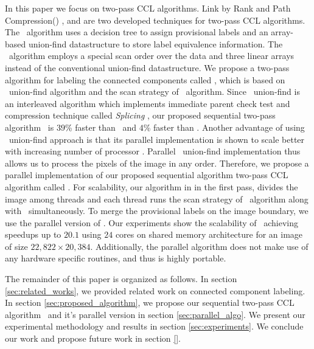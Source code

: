 In this paper we focus on two-pass CCL algorithms. Link by Rank and Path
Compression(\lrpc) \cite{Wu2009_LRPC}, and \arun \cite{He2012_ARun} are two
developed techniques for two-pass CCL algorithms.
The \lrpc\ algorithm uses a decision tree to assign provisional labels and an array-based union-find datastructure
to store label equivalence information. The \arun\ algorithm employs a special scan order over the data and three linear
arrays instead of the conventional union-find datastructure. 
We propose a two-pass algorithm for labeling the connected components called
\aremsp, which is based on \rems\ union-find algorithm \cite{Patwary2010_RemSP}
and the scan strategy of \arun\ algorithm. Since \rems\ union-find is an
interleaved algorithm which implements immediate parent check test and 
compression technique called {\em Splicing} \cite{Patwary2010_RemSP}, our
proposed sequential two-pass algorithm \aremsp\ is $39$\% faster than \lrpc\
and $4$\% faster than \arun.
Another advantage of using \rems\ union-find approach is that its parallel implementation is shown to scale better
with increasing number of processor \cite{Patwary2012_PARemSP}. Parallel \rems\ union-find implementation thus allows us to
process the pixels of the image in any order. Therefore, we propose a parallel implementation of our proposed
sequential algorithm two-pass CCL algorithm called \paremsp. For scalability,
our algorithm in in the first pass, divides the image among threads and each
thread runs the scan strategy of \arun\ algorithm along with \remsp\
simultaneously. To merge the provisional labels on the image boundary, we use the parallel version of \remsp \cite{Patwary2012_PARemSP}. Our experiments show
the scalability of \paremsp\ achieving speedups up to $20.1$ using $24$ cores
on shared memory architecture for an image of size $22,822 \times 20,384$.
Additionally, the parallel algorithm does not make use of any hardware specific routines, and thus is highly portable.

The remainder of this paper is organized as follows. In section
\ref{sec:related_works}, we provided related work on connected component labeling.
In section \ref{sec:proposed_algorithm}, we propose our sequential two-pass CCL
algorithm \aremsp\ and it's parallel version in section
\ref{sec:parallel_algo}.
We present our experimental methodology and results in section
\ref{sec:experiments}. We conclude our work and propose future work in section \ref{}.


